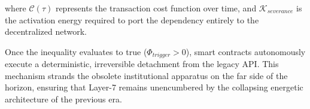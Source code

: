 where $\mathcal{C}(\tau)$ represents the transaction cost function over time, and $\mathcal{K}_{severance}$ is the activation energy required to port the dependency entirely to the decentralized network. 

Once the inequality evaluates to true ($\Phi_{trigger} > 0$), smart contracts autonomously execute a deterministic, irreversible detachment from the legacy API. This mechanism strands the obsolete institutional apparatus on the far side of the horizon, ensuring that Layer-7 remains unencumbered by the collapsing energetic architecture of the previous era.
